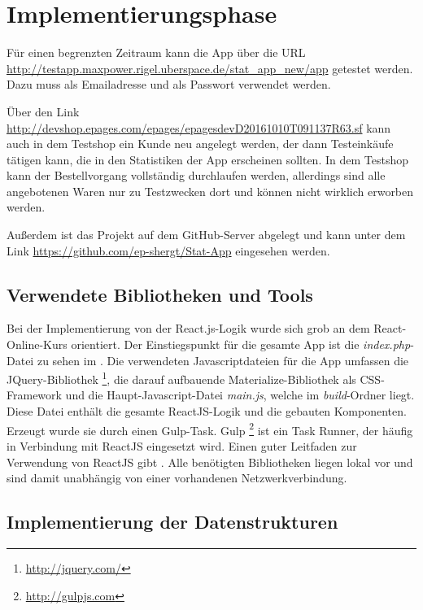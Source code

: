 \section{Implementierungsphase} 
\label{sec:Implementierungsphase}

Für einen begrenzten Zeitraum kann die App über die URL \url{http://testapp.maxpower.rigel.uberspace.de/stat_app_new/app} getestet werden. Dazu muss als Emailadresse  und als Passwort  verwendet werden.

Über den Link \url{http://devshop.epages.com/epages/epagesdevD20161010T091137R63.sf} kann auch in dem Testshop ein Kunde neu angelegt werden, der dann Testeinkäufe tätigen kann, die in den Statistiken der App erscheinen sollten. In dem Testshop kann der Bestellvorgang vollständig durchlaufen werden, allerdings sind alle angebotenen Waren nur zu Testzwecken dort und können nicht wirklich erworben werden.

Außerdem ist das Projekt auf dem \acs{GitHub}-Server abgelegt und kann unter dem Link \url{https://github.com/ep-shergt/Stat-App} eingesehen werden.

\subsection{Verwendete Bibliotheken und Tools}
\label{sec:Tools}
Bei der Implementierung von der React.js-Logik wurde sich grob an dem React-Online-Kurs \cite{Wes} orientiert.
Der Einstiegspunkt für die gesamte App ist die \textit{index.php}-Datei zu sehen im . Die verwendeten Javascriptdateien für die App umfassen die JQuery-Bibliothek \footnote{\url{http://jquery.com/}}, die darauf aufbauende Materialize-Bibliothek als \acs{CSS}-Framework und die Haupt-Javascript-Datei \textit{main.js}, welche im \textit{build}-Ordner liegt. Diese Datei enthält die gesamte ReactJS-Logik und die gebauten Komponenten. Erzeugt wurde sie durch einen Gulp-Task. Gulp \footnote{\url{http://gulpjs.com}} ist ein Task Runner, der häufig in Verbindung mit ReactJS eingesetzt wird. Einen guter Leitfaden zur Verwendung von ReactJS gibt \cite{React}. Alle benötigten Bibliotheken liegen lokal vor und sind damit unabhängig von einer vorhandenen Netzwerkverbindung.

\subsection{Implementierung der Datenstrukturen}
\label{sec:ImplementierungDatenstrukturen}

